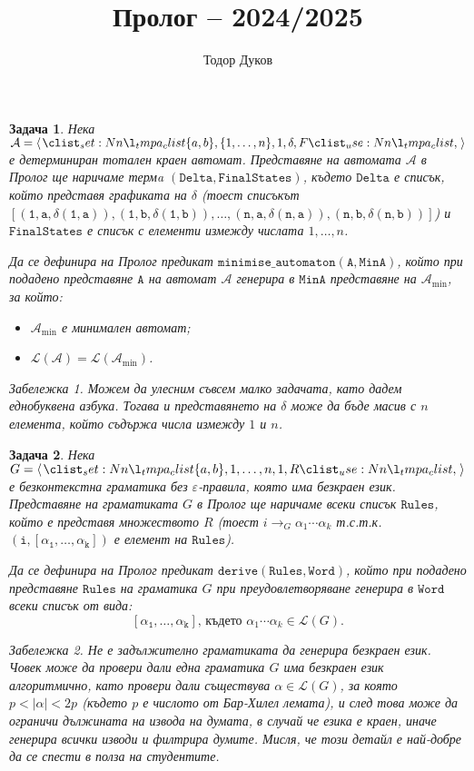 \documentclass[12pt]{article}
\title{Пролог -- 2024/2025}
\author{Тодор Дуков}
\date{}
\newcommand{\calA}{\mathcal{A}}
\newcommand{\calL}{\mathcal{L}}
\newtheorem{problem}{Задача}
\theoremstyle{definition}
\theoremstyle{remark}
\newtheorem*{remark}{Забележка}
\begin{document}
\maketitle

\begin{problem}
Нека $\calA = \opair{\{ a, b \}, \{1, \dots, n \}, 1, \delta, F}$ е детерминиран тотален краен автомат.
Представяне на автомата $\calA$ в Пролог ще наричаме термa $\mathtt{(Delta, FinalStates)}$, където $\mathtt{Delta}$ е списък, който представя графиката на $\delta$ (тоест списъкът $\mathtt{[(1, a, \delta(1, a)), (1, b, \delta(1, b)), \dots, (n, a, \delta(n, a)), (n, b, \delta(n, b))]}$) и $\mathtt{FinalStates}$ е списък с елементи измежду числата $1, \dots, n$.

Да се дефинира на Пролог предикат $\mathtt{minimise\_automaton(A, MinA)}$, който при подадено представяне $\mathtt{A}$ на автомат $\calA$ генерира в $\mathtt{MinA}$ представяне на $\calA_{\min}$, за който:
\begin{itemize}
    \item $\calA_{\min}$ е минимален автомат;
    \item $\calL(\calA) = \calL(\calA_{\min})$.
\end{itemize}
\begin{remark}
    Можем да улесним съвсем малко задачата, като дадем еднобуквена азбука.
    Тогава и представянето на $\delta$ може да бъде масив с $n$ елемента, който съдържа числа измежду $1$ и $n$.
\end{remark}
\end{problem}

\begin{problem}
Нека $G = \opair{\{ a, b \}, {1, \dots, n}, 1, R}$ е безконтекстна граматика без $\varepsilon$-правила, която има безкраен език.
Представяне на граматиката $G$ в Пролог ще наричаме всеки списък $\mathtt{Rules}$, който е представя множеството $R$ (тоест $i \rightarrow_G \alpha_1 \cdots \alpha_k$ т.с.т.к. $\mathtt{(i, [\alpha_1, \dots, \alpha_k])}$ е елемент на $\mathtt{Rules}$).

Да се дефинира на Пролог предикат $\mathtt{derive(Rules, Word)}$, който при подадено представяне $\mathtt{Rules}$ на граматика $G$ при преудовлетворяване генерира в $\mathtt{Word}$ всеки списък от вида:
\[
    \mathtt{[\alpha_1, \dots, \alpha_k]} \text{, където } \alpha_1 \cdots \alpha_k \in \calL(G).
\]
\begin{remark}
    Не е задължително граматиката да генерира безкраен език.
    Човек може да провери дали една граматика $G$ има безкраен език алгоритмично, като провери дали съществува $\alpha \in \calL(G)$, за която $p < |\alpha| < 2p$ (където $p$ е числото от Бар-Хилел лемата), и след това може да ограничи дължината на извода на думата, в случай че езика е краен, иначе генерира всички изводи и филтрира думите.
    Мисля, че този детайл е най-добре да се спести в полза на студентите.
\end{remark}
\end{problem}
\end{document}
